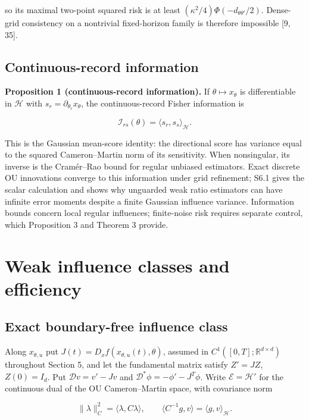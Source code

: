 \documentclass[ejs]{imsart}
\begin{document}
so its maximal two-point squared risk is at least
\((\kappa^2/4)\Phi(-d_{\theta\theta'}/2)\). Dense-grid consistency on a
nontrivial fixed-horizon family is therefore impossible {[}9, 35{]}.

\subsection{Continuous-record
information}\label{continuous-record-information}

\textbf{Proposition 1 (continuous-record information).} If
\(\theta\mapsto x_\theta\) is differentiable in \(\mathcal H\) with
\(s_r=\partial_{\theta_r}x_\theta\), the continuous-record Fisher
information is

\[
\mathcal I_{rs}(\theta)=\langle s_r,s_s\rangle_{\mathcal H}.
\]

This is the Gaussian mean-score identity: the directional score has
variance equal to the squared Cameron--Martin norm of its sensitivity.
When nonsingular, its inverse is the Cramér--Rao bound for regular
unbiased estimators. Exact discrete OU innovations converge to this
information under grid refinement; S6.1 gives the scalar calculation and
shows why unguarded weak ratio estimators can have infinite error
moments despite a finite Gaussian influence variance. Information bounds
concern local regular influences; finite-noise risk requires separate
control, which Proposition 3 and Theorem 3 provide.

\section{Weak influence classes and
efficiency}\label{weak-influence-classes-and-efficiency}

\subsection{Exact boundary-free influence
class}\label{exact-boundary-free-influence-class}

Along \(x_{\theta,u}\) put \(J(t)=D_xf(x_{\theta,u}(t),\theta)\),
assumed in \(C^1([0,T];\mathbb R^{d\times d})\) throughout Section 5,
and let the fundamental matrix satisfy \(Z'=JZ\), \(Z(0)=I_d\). Put
\(\mathcal D v=v'-Jv\) and \(\mathcal D^*\phi=-\phi'-J^T\phi\). Write
\(\mathcal E=\mathcal H'\) for the continuous dual of the OU
Cameron--Martin space, with covariance norm

\[
\|\lambda\|_C^2=\langle\lambda,C\lambda\rangle,
\qquad
\langle C^{-1}g,v\rangle=\langle g,v\rangle_{\mathcal H}.
\]
\end{document}
